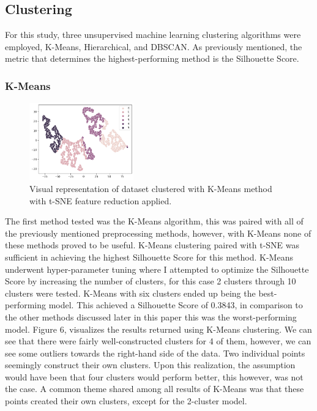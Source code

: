 \documentclass[twocolumn]{article}
\begin{document}
\subsection{Clustering}

For this study, three unsupervised machine learning clustering algorithms were employed, K-Means, Hierarchical, and DBSCAN. As previously mentioned, the metric that determines the highest-performing method is the Silhouette Score. 

\subsubsection{K-Means}

\begin{figure}
    \centering
    \includegraphics[width=0.4\textwidth]{images/kmeans.png}
    \caption{Visual representation of dataset clustered with K-Means method with t-SNE feature reduction applied.}
\end{figure}

The first method tested was the K-Means algorithm, this was paired with all of the previously mentioned preprocessing methods, however, with K-Means none of these methods proved to be useful. K-Means clustering paired with t-SNE was sufficient in achieving the highest Silhouette Score for this method. K-Means underwent hyper-parameter tuning where I attempted to optimize the Silhouette Score by increasing the number of clusters, for this case 2 clusters through 10 clusters were tested. K-Means with six clusters ended up being the best-performing model. This achieved a Silhouette Score of 0.3843, in comparison to the other methods discussed later in this paper this was the worst-performing model. Figure 6, visualizes the results returned using K-Means clustering. We can see that there were fairly well-constructed clusters for 4 of them, however, we can see some outliers towards the right-hand side of the data. Two individual points seemingly construct their own clusters. Upon this realization, the assumption would have been that four clusters would perform better, this however, was not the case. A common theme shared among all results of K-Means was that these points created their own clusters, except for the 2-cluster model.
\end{document}
